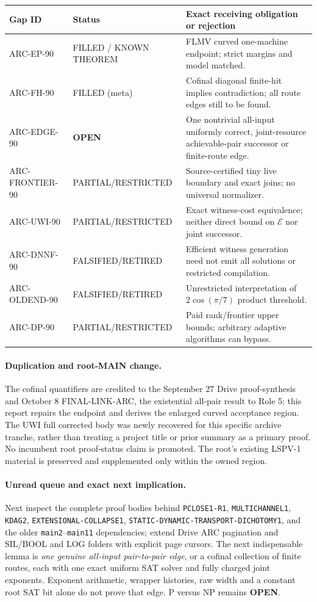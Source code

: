 \documentclass[11pt]{article}
\newcommand{\E}{\mathcal E}
\newcommand{\OPEN}{\textbf{OPEN}}
\begin{document}
\begin{center}\small
\begin{tabularx}{\linewidth}{p{.18\linewidth}p{.17\linewidth}X}
\toprule
Gap ID & Status & Exact receiving obligation or rejection\\\midrule
ARC-EP-90 & FILLED / KNOWN THEOREM & FLMV curved one-machine endpoint; strict margins and model matched.\\
ARC-FH-90 & FILLED (meta) & Cofinal diagonal finite-hit implies contradiction; all route edges still to be found.\\
ARC-EDGE-90 & \OPEN & One nontrivial all-input uniformly correct, joint-resource achievable-pair successor or finite-route edge.\\
ARC-FRONTIER-90 & PARTIAL/RESTRICTED & Source-certified tiny live boundary and exact joins; no universal normalizer.\\
ARC-UWI-90 & PARTIAL/RESTRICTED & Exact witness-cost equivalence; neither direct bound on $\E$ nor joint successor.\\
ARC-DNNF-90 & FALSIFIED/RETIRED & Efficient witness generation need not emit all solutions or restricted compilation.\\
ARC-OLDEND-90 & FALSIFIED/RETIRED & Unrestricted interpretation of $2\cos(\pi/7)$ product threshold.\\
ARC-DP-90 & PARTIAL/RESTRICTED & Paid rank/frontier upper bounds; arbitrary adaptive algorithms can bypass.\\
\bottomrule
\end{tabularx}
\end{center}

\paragraph{Duplication and root-MAIN change.}
The cofinal quantifiers are credited to the September 27 Drive proof-synthesis and October 8 FINAL-LINK-ARC, the existential all-pair result to Role 5; this report repairs the endpoint and derives the enlarged curved acceptance region. The UWI full corrected body was newly recovered for this specific archive tranche, rather than treating a project title or prior summary as a primary proof. No incumbent root proof-status claim is promoted. The root's existing LSPV-1 material is preserved and supplemented only within the owned region.

\paragraph{Unread queue and exact next implication.}
Next inspect the complete proof bodies behind \texttt{PCLOSE1-R1}, \texttt{MULTICHANNEL1}, \texttt{KDAG2}, \texttt{EXTENSIONAL-COLLAPSE1}, \texttt{STATIC-DYNAMIC-TRANSPORT-DICHOTOMY1}, and the older \texttt{main2}--\texttt{main11} dependencies; extend Drive ARC pagination and SIL/BOOL and LOG folders with explicit page cursors. The next indispensable lemma is \emph{one genuine all-input pair-to-pair edge}, or a cofinal collection of finite routes, each with one exact uniform SAT solver and fully charged joint exponents. Exponent arithmetic, wrapper histories, raw width and a constant root SAT bit alone do not prove that edge. P versus NP remains \OPEN.
\end{document}
